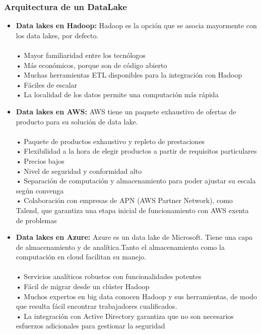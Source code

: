 \documentclass[%
 reprint,
 amsmath,amssymb,
 aps,
]{revtex4-1}
\begin{document}
\subsubsection{\textbf{Arquitectura de un DataLake}}
\begin{itemize}
	\item \textbf{ Data lakes en Hadoop:} Hadoop es la opción que se asocia mayormente con los data lakes, por defecto. \cite{referenciasosa2}\\\\
• Mayor familiaridad entre los tecnólogos \\
• Más económicos, porque son de código abierto \\
• Muchas herramientas ETL disponibles para la integración con Hadoop \\
• Fáciles de escalar \\
• La localidad de los datos permite una computación más rápida

	\item  \textbf{Data lakes en AWS:} AWS tiene un paquete exhaustivo de ofertas de producto para su solución de data lake.\\\\
• Paquete de productos exhaustivo y repleto de prestaciones\\
• Flexibilidad a la hora de elegir productos a partir de requisitos particulares\\
• Precios bajos\\
• Nivel de seguridad y conformidad alto\\
• Separación de computación y almacenamiento para poder ajustar su escala según convenga\\
• Colaboración con empresas de APN (AWS Partner Network), como Talend, que garantiza una etapa inicial de funcionamiento con AWS exenta de problemas

	\item  \textbf{ Data lakes en Azure:} Azure es un data lake de Microsoft. Tiene una capa de almacenamiento y de analítica.Tanto el almacenamiento como la computación en cloud facilitan su manejo.\\\\
• Servicios analíticos robustos con funcionalidades potentes\\
• Fácil de migrar desde un clúster Hadoop \\
• Muchos expertos en big data conocen Hadoop y sus herramientas, de modo que resulta fácil encontrar trabajadores cualificados.\\
• La integración con Active Directory garantiza que no son necesarios esfuerzos adicionales para gestionar la seguridad\\
\end{itemize}
\newpage
\end{document}

